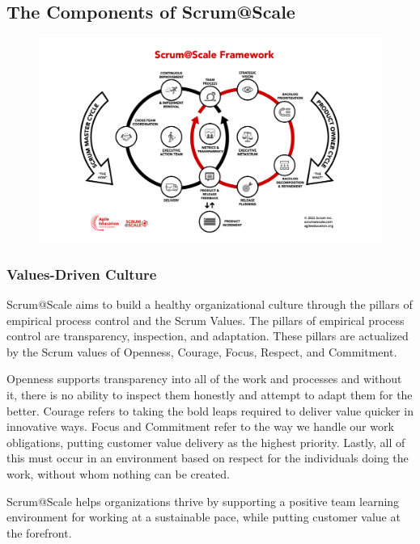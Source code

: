\documentclass[12pt,a4paper,parskip=full]{scrartcl}
\begin{document}
\subsection{The Components of
Scrum@Scale}\label{the-components-of-scrumatscale}
\begin{figure}[H]
    \centering
    \includegraphics[scale=0.25]{SMPO-Cycle.png}
\end{figure}


\subsubsection{Values-Driven Culture}\label{values-driven-culture}

Scrum@Scale aims to build a healthy organizational culture through the pillars of empirical process control and the Scrum Values. The pillars of empirical process control are transparency, inspection, and adaptation.  These pillars are actualized by the Scrum values of Openness, Courage, Focus, Respect, and Commitment.

Openness supports transparency into all of the work and processes and without it, there is no ability to inspect them honestly and attempt to adapt them for the better. Courage refers to taking the bold leaps required to deliver value quicker in innovative ways. Focus and Commitment refer to the way we handle our work obligations, putting customer value delivery as the highest priority. Lastly, all of this must occur in an environment based on respect for the individuals doing the work, without whom nothing can be created.

Scrum@Scale helps organizations thrive by supporting a positive team learning environment for working at a sustainable pace, while putting customer value at the forefront.
\end{document}
